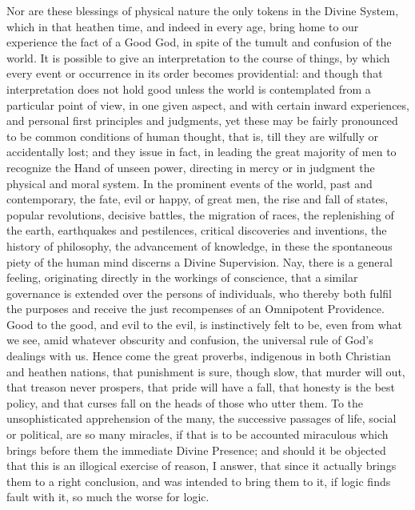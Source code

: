 Nor are these blessings of physical nature the only tokens in the
Divine System, which in that heathen time, and indeed in every
age, bring home to our experience the fact of a Good God, in spite of
the tumult and confusion of the world. It is possible to give an
interpretation to the course of things, by which every event or
occurrence in its order becomes providential: and though that
interpretation does not hold good unless the world is contemplated
from a particular point of view, in one given aspect, and with certain
inward experiences, and personal first principles and judgments, yet
these may be fairly pronounced to be common conditions of human
thought, that is, till they are wilfully or accidentally lost; and
they issue in fact, in leading the great majority of men to recognize
the Hand of unseen power, directing in mercy or in judgment the
physical and moral system. In the prominent events of the world, past
and contemporary, the fate, evil or happy, of great men, the rise and
fall of states, popular revolutions, decisive battles, the migration
of races, the replenishing of the earth, earthquakes and pestilences,
critical discoveries and inventions, the history of philosophy, the
advancement of knowledge, in these the spontaneous piety of the human
mind discerns a Divine Supervision. Nay, there is a general feeling,
originating directly in the workings of conscience, that a similar
governance is extended over the persons of individuals, who thereby
both fulfil the purposes and receive the just recompenses of an
Omnipotent Providence. Good to the good, and evil to the evil, is
instinctively felt to be, even from what we see, amid whatever
obscurity and confusion, the universal rule of God's dealings with us.
Hence come the great proverbs, indigenous in both Christian and
heathen nations, that punishment is sure, though slow, that murder
will out, that treason never prospers, that pride will have a fall,
that honesty is the best policy, and that curses fall on the heads of
those who utter them. To the unsophisticated apprehension of the many,
the successive passages of life, social or political, are so many
miracles, if that is to be accounted miraculous which brings before
them the immediate Divine Presence; and should it be objected that
this is an illogical exercise of reason, I answer, that since it
actually brings them to a right conclusion, and was intended to bring
them to it, if logic finds fault with it, so much the worse for logic.

